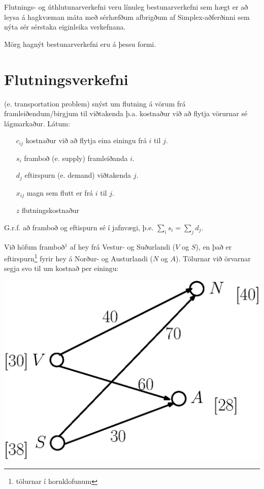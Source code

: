 Flutnings- og úthlutunarverkefni veru línuleg bestunarverkefni sem hægt er að leysa á hagkvæman máta með sérhæfðum afbrigðum af Simplex-aðferðinni sem  nýta sér sérstaka eiginleika verkefnana.
\begin{aths}Mörg hagnýt bestunarverkefni eru á þessu formi.\end{aths}

\section{Flutningsverkefni}

 (e. transportation problem) snýst um flutning á vörum frá framleiðendum/birgjum til viðtakenda þ.a. kostnaður við að flytja vörurnar sé lágmarkaður. Látum:
\begin{enumerate}
 \item[$c_{ij}$] kostnaður við að flytja eina einingu frá $i$ til $j$.
 \item[$s_i$] framboð (e. supply) framleiðanda $i$.
 \item[$d_j$] eftirspurn (e. demand) viðtakenda $j$.
 \item[$x_{ij}$] magn sem flutt er frá $i$ til $j$.
 \item[$z$] flutningskostnaður
\end{enumerate}
G.r.f. að framboð og eftispurn sé í jafnvægi, þ.e. $\sum_i s_i = \sum_j d_j$.

\begin{daemi}[Heyflutningur] Við höfum framboð$^1$ af hey frá Vestur- og Suðurlandi ($V$ og $S$), en það er eftirspurn\footnote{tölurnar í hornklofunum} fyrir hey á Norður- og Austurlandi ($N$ og $A$).  Tölurnar við örvarnar segja svo til um kostnað per einingu:

\begin{center}
  \includegraphics[width=0.4\columnwidth]{figs/flutningsverkefni1.eps}
\end{center}
\end{daemi}


